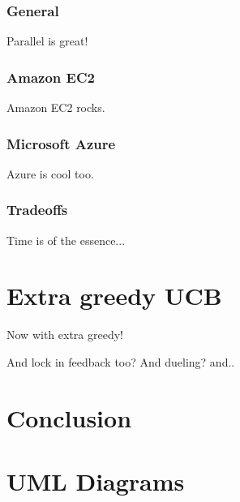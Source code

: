\documentclass{jss}\usepackage[]{graphicx}\usepackage[]{color}
\begin{document}
\subsubsection{General}

Parallel is great!

\subsubsection{Amazon EC2}

Amazon EC2 rocks.

\subsubsection{Microsoft Azure}

Azure is cool too.

\subsubsection{Tradeoffs}

Time is of the essence...

\section{Extra greedy UCB}

Now with extra greedy!

And lock in feedback too? And dueling? and..

\section{Conclusion}
\label{sec:conc4}

\section{UML Diagrams}
\end{document}
